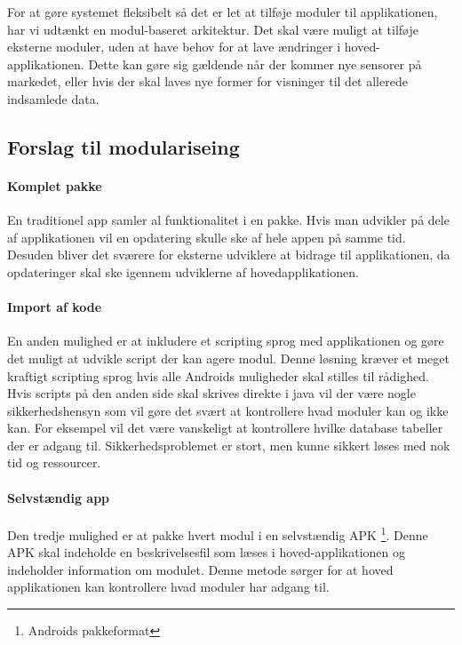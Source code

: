 
For at gøre systemet fleksibelt så det er let at tilføje moduler til applikationen, har vi udtænkt en modul-baseret arkitektur.
Det skal være muligt at tilføje eksterne moduler, uden at have behov for at lave ændringer i hoved-applikationen.
Dette kan gøre sig gældende når der kommer nye sensorer på markedet, eller hvis der skal laves nye former for visninger til det allerede indsamlede data.

\subsection{Forslag til modulariseing}
\paragraph{Komplet pakke}
En traditionel app samler al funktionalitet i en pakke.
Hvis man udvikler på dele af applikationen vil en opdatering skulle ske af hele appen på samme tid.
Desuden bliver det sværere for eksterne udviklere at bidrage til applikationen, da opdateringer skal ske igennem udviklerne af hovedapplikationen.

\paragraph{Import af kode}
En anden mulighed er at inkludere et scripting sprog med applikationen og gøre det muligt at udvikle script der kan agere modul.
Denne løsning kræver et meget kraftigt scripting sprog hvis alle Androids muligheder skal stilles til rådighed.
Hvis scripts på den anden side skal skrives direkte i java vil der være nogle sikkerhedshensyn som vil gøre det svært at kontrollere hvad moduler kan og ikke kan.
For eksempel vil det være vanskeligt at kontrollere hvilke database tabeller der er adgang til.
Sikkerhedsproblemet er stort, men kunne sikkert løses med nok tid og ressourcer.

\paragraph{Selvstændig app}
Den tredje mulighed er at pakke hvert modul i en selvstændig APK \footnote{Androids pakkeformat}.
Denne APK skal indeholde en beskrivelsesfil som læses i hoved-applikationen og indeholder information om modulet.
Denne metode sørger for at hoved applikationen kan kontrollere hvad moduler har adgang til. 

